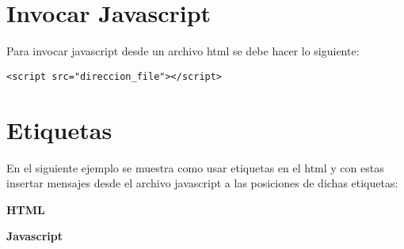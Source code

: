 \section{Invocar Javascript}

Para invocar javascript desde un archivo html se debe hacer lo siguiente:

\begin{lstlisting}[numbers=none]
  <script src="direccion_file"></script>
\end{lstlisting}

\section{Etiquetas}

En el siguiente ejemplo se muestra como usar etiquetas en el html y con estas insertar mensajes desde el archivo javascript a las posiciones de dichas etiquetas:

\textbf{HTML}



\textbf{Javascript}


